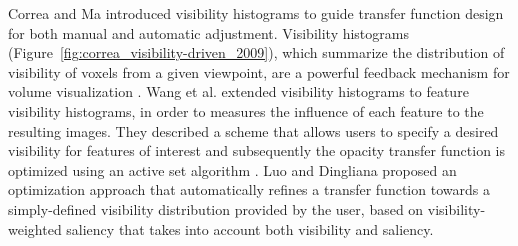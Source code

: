 \documentclass{egpubl}
\begin{document}
Correa and Ma \cite{correa_visibility-driven_2009} introduced visibility histograms to guide transfer function design for both manual and automatic adjustment.
Visibility histograms (Figure~\ref{fig:correa_visibility-driven_2009}), which summarize the distribution of visibility of voxels from a given viewpoint, are a powerful feedback mechanism for volume visualization \cite{emsenhuber_visibility_2008}.
Wang et al. \cite{wang_efficient_2011} extended visibility histograms to feature visibility histograms, in order to measures the influence of each feature to the resulting images. They described a scheme that allows users to specify a desired visibility for features of interest and subsequently the opacity transfer function is optimized using an active set algorithm \cite{polyak_conjugate_1969}.
Luo and Dingliana \cite{luo_transfer_function_2017} proposed an optimization approach that automatically refines a transfer function towards a simply-defined visibility distribution provided by the user, based on visibility-weighted saliency \cite{luo_visibility-weighted_2015} that takes into account both visibility and saliency.


\end{document}
